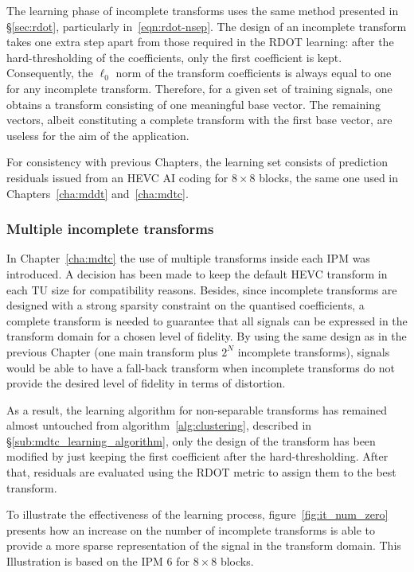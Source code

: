 \documentclass[11pt,a4paper,openright,twoside]{book}
\numberwithin{equation}{section} %
\numberwithin{figure}{section} %
\numberwithin{table}{section} %
\begin{document}
The learning phase of incomplete transforms uses the same method presented in
\S\ref{sec:rdot}, particularly in~\eqref{eqn:rdot-nsep}.
The design of an incomplete transform takes one extra step apart from those
required in the \ac{RDOT} learning:
after the hard-thresholding of the coefficients, only the first coefficient is
kept.
Consequently, the $\ell_0$ norm of the transform coefficients is always equal
to one for any incomplete transform.
Therefore, for a given set of training signals, one obtains a transform
consisting of one meaningful base vector.
The remaining vectors, albeit constituting a complete transform with the first
base vector, are useless for the aim of the application.

For consistency with previous Chapters, the learning set consists of
prediction residuals issued from an \ac{HEVC} \ac{AI} coding for $8\times8$
blocks, the same one used in Chapters~\ref{cha:mddt} and~\ref{cha:mdtc}.

\subsubsection{Multiple incomplete transforms}
\label{ssub:it_multiple_incomplete_transforms}

In Chapter~\ref{cha:mdtc} the use of multiple transforms inside each \ac{IPM}
was introduced.
A decision has been made to keep the default \ac{HEVC} transform in each
\ac{TU} size for compatibility reasons.
Besides, since incomplete transforms are designed with a strong sparsity
constraint on the quantised coefficients, a complete transform is needed to
guarantee that all signals can be expressed in the transform domain for a
chosen level of fidelity.
By using the same design as in the previous Chapter (one main transform plus
$2^N$ incomplete transforms), signals would be able to have a fall-back
transform when incomplete transforms do not provide the desired level of
fidelity in terms of distortion.

As a result, the learning algorithm for non-separable transforms has remained
almost untouched from algorithm~\ref{alg:clustering}, described in
\S\ref{sub:mdtc_learning_algorithm}, only the design of the transform has been
modified by just keeping the first coefficient after the hard-thresholding.
After that, residuals are evaluated using the \ac{RDOT} metric to assign them
to the best transform.

To illustrate the effectiveness of the learning process,
figure~\ref{fig:it_num_zero} presents how an increase on the number of
incomplete transforms is able to provide a more sparse representation of
the signal in the transform domain.
This Illustration is based on the \ac{IPM} 6 for $8\times8$ blocks.
\end{document}
